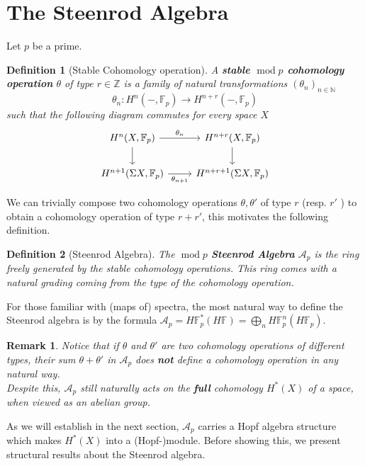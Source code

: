 \documentclass[11pt, a4paper]{article}
\DeclareMathOperator*{\cmod}{mod}
\newtheorem{defn}{Definition}
\newtheorem{rmk}[thm]{Remark}
\theoremstyle{plain}
\begin{document}
\section{The Steenrod Algebra}
Let $p$ be a prime.
\begin{defn}[Stable Cohomology operation]
	A \textbf{stable $\cmod p$ cohomology operation} $\theta$ of type $r\in \mathbb{Z}$ is a family of natural transformations $( \theta_n)_{n \in \mathbb{N}} $
\[ 
\theta_n\colon H^{n}( -, \mathbb{F}_p) \to H^{n+r}( -, \mathbb{F}_p) 
\]
such that the following diagram commutes for every space $X$ 
\[\begin{tikzcd}
	{H^n(X,\mathbb{F}_p)} & {H^{n+r}(X,\mathbb{F}_p)} \\
	{H^{n+1}(\Sigma X,\mathbb{F}_p)} & {H^{n+r+1}(\Sigma X,\mathbb{F}_p)}
	\arrow["{\theta_n}", from=1-1, to=1-2]
	\arrow[from=1-1, to=2-1]
	\arrow[from=1-2, to=2-2]
	\arrow["{\theta_{n+1}}"', from=2-1, to=2-2]
\end{tikzcd}\]
\end{defn}
We can trivially compose two cohomology operations $\theta, \theta'$ of type $r$ (resp. $r'$ ) to obtain a cohomology operation of type $r+r'$, this motivates the following definition.
\begin{defn}[Steenrod Algebra]
	The $\cmod p$ \textbf{Steenrod Algebra} $\mathcal{A}_p$  is the ring freely generated by the stable cohomology operations.
	This ring comes with a natural grading coming from the type of the cohomology operation.
\end{defn}
For those familiar with (maps of) spectra, the most natural way to define the Steenrod algebra is by the formula $\mathcal{A}_p = H\mathbb{F}_p^{\ast}( H\mathbb{F}) = \bigoplus_n H\mathbb{F}_p^{n}( H\mathbb{F}_p) $.
\begin{rmk}
	Notice that if $\theta$ and $\theta'$ are two cohomology operations of different types, their sum $\theta+\theta'$ in $\mathcal{A}_p$ does \textbf{not} define a cohomology operation in any natural way.\\
	Despite this, $\mathcal{A}_p$ still naturally acts on the \textbf{full} cohomology $H^{\ast}( X) $ of a space, when viewed as an abelian group.
\end{rmk}
As we will establish in the next section, $\mathcal{A}_p$ carries a Hopf algebra structure which makes $H^{\ast}( X) $ into a (Hopf-)module.
Before showing this, we present structural results about the Steenrod algebra.
\end{document}
